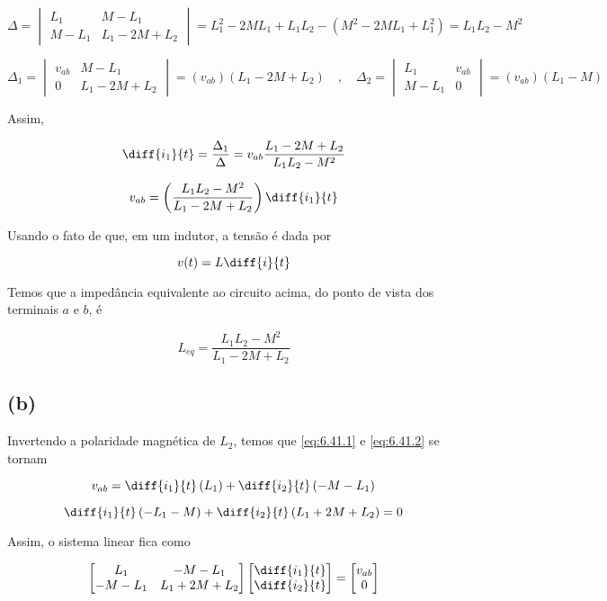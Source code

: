 \begingroup
\renewcommand*{\arraystretch}{4}

\[ 
    \Delta
    =
    \begin{vmatrix}
        L_1 & M - L_1    \\
        M - L_1    & L_1 - 2M + L_2
    \end{vmatrix}
    =
    L_1^2 - 2ML_1 + L_1L_2 - (M^2 - 2ML_1 + L_1^2)
    =
    L_1L_2 - M^2
\]

\[ 
    \Delta_1
    =
    \begin{vmatrix}
        v_{ab} & M - L_1    \\
        0    & L_1 - 2M + L_2
    \end{vmatrix}
    =
    (v_{ab})(L_1 - 2M + L_2) \quad , \quad
    \Delta_2
    =
    \begin{vmatrix}
        L_1 & v_{ab}   \\
        M - L_1    & 0
    \end{vmatrix}
    =
    (v_{ab})(L_1 - M)
\]

\endgroup

Assim, 

\[ \diff{i_1}{t} = \frac{\Delta_1}{\Delta} = v_{ab}\frac{L_1 - 2M + L_2}{L_1L_2 - M^2} \]

\[ v_{ab} =  \left(\frac{L_1L_2 - M^2}{L_1 - 2M + L_2}\right)\diff{i_1}{t} \]

Usando o fato de que, em um indutor, a tensão é dada por 

\[ v(t) = L\diff{i}{t} \]

Temos que a impedância equivalente ao circuito acima, do ponto de vista dos terminais $a$ e $b$, é

\[ \boxed{L_{eq} = \frac{L_1L_2 - M^2}{L_1 - 2M + L_2}}  \]

\subsection*{(b)}

Invertendo a polaridade magnética de $L_2$, temos que \eqref{eq:6.41.1} e \eqref{eq:6.41.2} se tornam

\[ v_{ab} = \diff{i_1}{t}\left(L_1\right) + \diff{i_2}{t}\left(- M - L_1\right) \]

\[ \diff{i_1}{t}\left(-L_1 - M\right) + \diff{i_2}{t}\left(L_1 + 2M + L_2\right) = 0 \]

Assim, o sistema linear fica como

\begingroup
\renewcommand*{\arraystretch}{4}

\[
    \begin{bmatrix}
        L_1 & - M - L_1    \\
        - M - L_1    & L_1 + 2M + L_2
    \end{bmatrix}
    \begin{bmatrix}
        \diff{i_1}{t} \\
        \diff{i_2}{t}
    \end{bmatrix}
    =
    \begin{bmatrix}
        v_{ab} \\
        0
    \end{bmatrix}
\]

